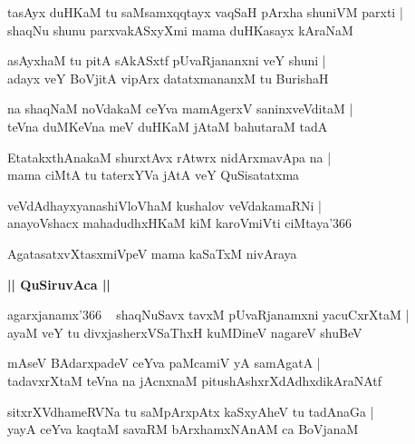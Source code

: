 \documentclass[twoside,12pt,openright]{book}
\newcounter{shloka}[chapter]
\def\uvaca#1{\centerline{{\large\textbf{#1}}}}
\begin{document}
\begin{shloka}%
tasAyx duHKaM tu saMsamxqqtayx vaqSaH pArxha shuniVM parxti |\\
shaqNu shunu parxvakASxyXmi mama duHKasayx kAraNaM 
\end{shloka}

\begin{shloka}%
asAyxhaM tu pitA sAkASxtf pUvaRjananxni veY shuni |\\
adayx veY BoVjitA vipArx datatxmananxM tu BurishaH 
\end{shloka}

\begin{shloka}%
na shaqNaM noVdakaM ceYva mamAgerxV saninxveVditaM |\\
teVna duMKeVna meV duHKaM jAtaM bahutaraM tadA
\end{shloka}

\begin{shloka}%
EtatakxthAnakaM shurxtAvx rAtwrx nidArxmavApa na |\\
mama ciMtA tu taterxYVa jAtA veY QuSisatatxma
\end{shloka}

\begin{shloka}%
veVdAdhayxyanashiVloVhaM kushalov veVdakamaRNi |\\
anayoVshacx mahadudhxHKaM kiM karoVmiVti ciMtaya\char'366
\end{shloka}

\begin{shloka}%
AgatasatxvXtasxmiVpeV mama kaSaTxM nivAraya
\end{shloka}

\uvaca{|| QuSiruvAca ||}

\begin{shloka}%
agarxjanamx\char'366 ~ shaqNuSavx tavxM pUvaRjanamxni yacuCxrXtaM |\\
ayaM veY tu divxjasherxVSaThxH kuMDineV nagareV shuBeV 
\end{shloka}

\begin{shloka}%
mAseV BAdarxpadeV ceYva paMcamiV yA samAgatA |\\
tadavxrXtaM teVna na jAcnxnaM pitushAshxrXdAdhxdikAraNAtf 
\end{shloka}

\begin{shloka}%
sitxrXVdhameRVNa tu saMpArxpAtx kaSxyAheV tu tadAnaGa |\\
yayA ceYva kaqtaM savaRM bArxhamxNAnAM ca BoVjanaM 
\end{shloka}
\end{document}
